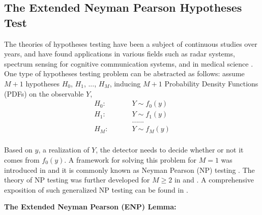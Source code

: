 \subsection{The Extended Neyman Pearson Hypotheses Test}
The theories of hypotheses testing have been a subject of continuous studies over years, and have found applications in various fields such as radar systems, spectrum sensing for cognitive communication systems, and in  medical science \cite{ma2008soft, srinivasan1986distributed, spielman1973refutation}. One type of hypotheses testing problem can be abstracted as  follows: assume $M+1$  hypotheses $H_0$, $H_1$, ..., $H_{M}$, inducing $M+1$  Probability Density Functions (PDFs) on the observable $Y$,
\begin{equation}
\label{equ:hypothesis}
\begin{split}
H_0:\;\;\;\;\;\;\;\;\;&Y \sim f_0(y) \\
H_1:\;\;\;\;\;\;\;\;\;&Y \sim f_1(y)\\
&......\\
H_M:\;\;\;\;\;\;\;\;\;&Y \sim f_M(y)\\
\end{split}
\end{equation}

Based on $y$, a realization of $Y$, the detector needs to decide whether or not it comes from $f_0(y)$. A framework for solving this problem for $M=1$ was introduced in \cite{neyman1933problem} and it is commonly known as Neyman Pearson (NP) testing \cite{neyman1933problem}. The theory of NP testing was further developed for $M \geq 2$ in \cite{wald1939contributions} and \cite{dantzig1951fundamental}.  A comprehensive exposition of such generalized NP testing can be found in \cite{LehmannTest}.

\noindent  \textbf{The Extended Neyman Pearson (ENP) Lemma:}


